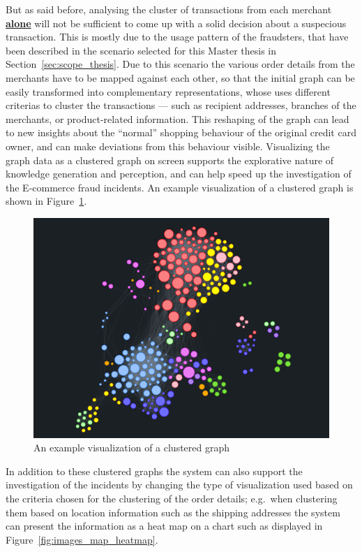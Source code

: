 But as said before, analysing the cluster of transactions from each merchant \textbf{\underline{alone}} will not be sufficient to come up with a solid decision about a suspecious transaction. This is mostly due to the usage pattern of the fraudsters, that have been described in the scenario selected for this Master thesis in Section~\ref{sec:scope_thesis}. Due to this scenario the various order details from the merchants have to be mapped against each other, so that the initial graph can be easily transformed into complementary representations, whose uses different criterias to cluster the transactions --- such as recipient addresses, branches of the merchants, or product-related information. This reshaping of the graph can lead to new insights about the ``normal'' shopping behaviour of the original credit card owner, and can make deviations from this behaviour visible. Visualizing the graph data as a clustered graph on screen supports the explorative nature of knowledge generation and perception, and can help speed up the investigation of the \gls{E-commerce} fraud incidents. An example visualization of a clustered graph is shown in Figure~\ref{fig:images_graph_viz}. \\

\begin{figure}[!ht]
  \centering
  \includegraphics[width=0.9\columnwidth]{images/GraphViz.png}
  \caption{An example visualization of a clustered graph \citep{visjsshowcase}}
\label{fig:images_graph_viz}
\end{figure}

 In addition to these clustered graphs the system can also support the investigation of the incidents by changing the type of visualization used based on the criteria chosen for the clustering of the order details; e.g.\ when clustering them based on location information such as the shipping addresses the system can present the information as a heat map on a chart such as displayed in Figure~\ref{fig:images_map_heatmap}. \@

